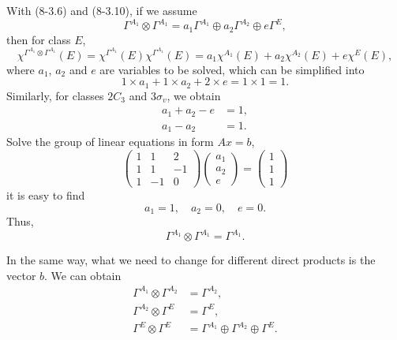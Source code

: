 \documentclass[a4paper]{book}
\begin{document}
\begin{solution}
\begin{enumerate}[label=(\alph*)]
		With (8-3.6) and (8-3.10), if we assume
		\begin{equation*}
			\Gamma^{A_1} \otimes \Gamma^{A_1} = a_1 \Gamma^{A_1} \oplus a_2 \Gamma^{A_2} \oplus e \Gamma^{E},
		\end{equation*}				
		then for class $E$,
		\begin{equation*}
			\chi^{\Gamma^{A_1}\otimes\Gamma^{A_1}}(E) = \chi^{\Gamma^{A_1}}(E) \chi^{\Gamma^{A_1}}(E) = a_1 \chi^{A_1}(E) + a_2 \chi^{A_2}(E) + e \chi^{E}(E),
		\end{equation*}
		where $a_1$, $a_2$ and $e$ are variables to be solved, which can be simplified into
		\begin{equation*}
			1 \times a_1 + 1 \times a_2 + 2 \times e = 1 \times 1 = 1.
		\end{equation*}
		Similarly, for classes $2C_3$ and $3\sigma_v$, we obtain
		\begin{align*}
			a_1 + a_2 - e &= 1 , \\
			a_1 - a_2 &= 1 .
		\end{align*}
		Solve the group of linear equations in form $Ax=b$,
		\begin{equation*}
			\begin{pmatrix}
				1 & 1 & 2 \\
				1 & 1 & -1 \\
				1 & -1 & 0
			\end{pmatrix}
			\begin{pmatrix}
				a_1 \\ a_2 \\ e
			\end{pmatrix} =
			\begin{pmatrix}
				1 \\ 1 \\ 1
			\end{pmatrix}
		\end{equation*}
		it is easy to find
		\begin{equation*}
			a_1 = 1 , \quad a_2 = 0 , \quad e = 0.
		\end{equation*}
		Thus,
		\begin{equation}
			\Gamma^{A_1} \otimes \Gamma^{A_1} = \Gamma^{A_1}.
		\end{equation}
		
		In the same way, what we need to change for different direct products is the vector $b$. We can obtain
		\begin{align}
			\Gamma^{A_1}\otimes\Gamma^{A_2} &= \Gamma^{A_2}, \\
			\Gamma^{A_2}\otimes\Gamma^{E} &= \Gamma^{E}, \\
			\Gamma^{E}\otimes\Gamma^{E} &= \Gamma^{A_1} \oplus \Gamma^{A_2} \oplus \Gamma^{E}.
		\end{align}
		

\end{enumerate}
\end{solution}
\end{document}
